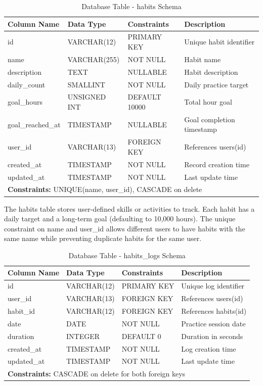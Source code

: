 \documentclass[12pt,a4paper]{report}
\newcommand{\JustifiedNormal}{\fontsize{12}{14}\selectfont\justifying\setlength{\parindent}{0pt}}
\begin{document}
\begin{table}[H]
\centering
\caption{Database Table - habits Schema}
\small
\begin{tabular}{|p{3.5cm}|p{3cm}|p{3cm}|p{4cm}|}
\hline
\textbf{Column Name} & \textbf{Data Type} & \textbf{Constraints} & \textbf{Description} \\
\hline
id & VARCHAR(12) & PRIMARY KEY & Unique habit identifier \\
\hline
name & VARCHAR(255) & NOT NULL & Habit name \\
\hline
description & TEXT & NULLABLE & Habit description \\
\hline
daily\_count & SMALLINT & NOT NULL & Daily practice target \\
\hline
goal\_hours & UNSIGNED INT & DEFAULT 10000 & Total hour goal \\
\hline
goal\_reached\_at & TIMESTAMP & NULLABLE & Goal completion timestamp \\
\hline
user\_id & VARCHAR(13) & FOREIGN KEY & References users(id) \\
\hline
created\_at & TIMESTAMP & NOT NULL & Record creation time \\
\hline
updated\_at & TIMESTAMP & NOT NULL & Last update time \\
\hline
\multicolumn{4}{|l|}{\textbf{Constraints:} UNIQUE(name, user\_id), CASCADE on delete} \\
\hline
\end{tabular}
\end{table}

\JustifiedNormal
The habits table stores user-defined skills or activities to track. Each habit has a daily target and a long-term goal (defaulting to 10,000 hours). The unique constraint on name and user\_id allows different users to have habits with the same name while preventing duplicate habits for the same user.

\begin{table}[H]
\centering
\caption{Database Table - habits\_logs Schema}
\small
\begin{tabular}{|p{3.5cm}|p{3cm}|p{3cm}|p{4cm}|}
\hline
\textbf{Column Name} & \textbf{Data Type} & \textbf{Constraints} & \textbf{Description} \\
\hline
id & VARCHAR(12) & PRIMARY KEY & Unique log identifier \\
\hline
user\_id & VARCHAR(13) & FOREIGN KEY & References users(id) \\
\hline
habit\_id & VARCHAR(12) & FOREIGN KEY & References habits(id) \\
\hline
date & DATE & NOT NULL & Practice session date \\
\hline
duration & INTEGER & DEFAULT 0 & Duration in seconds \\
\hline
created\_at & TIMESTAMP & NOT NULL & Log creation time \\
\hline
updated\_at & TIMESTAMP & NOT NULL & Last update time \\
\hline
\multicolumn{4}{|l|}{\textbf{Constraints:} CASCADE on delete for both foreign keys} \\
\hline
\end{tabular}
\end{table}
\end{document}
